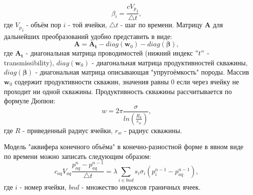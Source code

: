\documentclass[14pt]{article}
\begin{document}
\begin{equation} \label{beta_init}
 \beta_i = \frac{c {V_p}_i}{\bigtriangleup t},
\end{equation} 
где $ {V_p}_i $ - объём пор $ i $ - той ячейки, ${\bigtriangleup t}$ - шаг по времени.
Матрицу $\boldsymbol{A}$ для дальнейших преобразований удобно представить в виде:
\begin{equation} \label{A_diag}
\boldsymbol{A} = \boldsymbol{A_t} - diag\left(\boldsymbol{w}_0\right) - diag\left(\boldsymbol{\beta}\right),
\end{equation}
где $ \boldsymbol{A_t} $ - диагональная матрица проводимостей (нижний индекс $ "t" $ -transmissibility), $ diag\left(\boldsymbol{w}_0\right) $ - диагональная матрица продуктивностей скважины, $ diag\left(\boldsymbol{\beta}\right) $ - диагональная матрица описывающая "упругоёмкость" породы. Массив $\boldsymbol{w}_0$ содержит продуктивности скважин, значения равны 0 если через ячейку не проходит ни одной скважины. Продуктивность скважины рассчитывается по формуле Дюпюи:
\begin{equation} \label{WI}
w = 2 \pi\frac{\sigma}{ln\left(\frac{R_k}{r_w}\right)},
\end{equation} 
где $ R $ - приведенный радиус ячейки, $ r_w $ - радиус скважины.

Модель "аквифера конечного объёма" в конечно-разностной форме в явном виде по времени можно записать следующим образом: 
\begin{equation} \label{aq_num}
c_{aq} V_{aq}\frac{p_{aq}^n - p_{aq}^{n-1}}{\bigtriangleup t} = \lambda\sum_{i \in bnd}s_i\sigma_i(p_i^{n-1}-p_{aq}^{n-1}),
\end{equation}
где $ i $ - номер ячейки, $bnd$ - множество индексов граничных ячеек.
\end{document}
